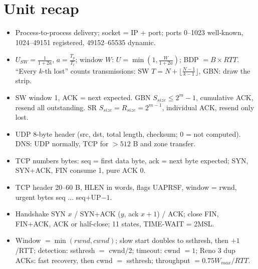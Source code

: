 \section*{Unit recap}
\begin{itemize}
  \item Process-to-process delivery; socket = IP + port; ports 0--1023 well-known, 1024--49151 registered, 49152--65535 dynamic.
  \item $U_{SW}=\frac{1}{1+2a}$, $a=\frac{T_p}{T_t}$; window $W$: $U=\min(1,\frac{W}{1+2a})$; BDP $=B\times RTT$. ``Every $k$-th lost'' counts transmissions: SW $T=N+\lfloor\frac{N-1}{k-1}\rfloor$, GBN: draw the strip.
  \item SW window 1, ACK = next expected. GBN $S_{size}\le2^m-1$, cumulative ACK, resend all outstanding. SR $S_{size}=R_{size}=2^{m-1}$, individual ACK, resend only lost.
  \item UDP 8-byte header (src, dst, total length, checksum; 0 = not computed). DNS: UDP normally, TCP for $>512$ B and zone transfer.
  \item TCP numbers bytes: seq = first data byte, ack = next byte expected; SYN, SYN+ACK, FIN consume 1, pure ACK 0.
  \item TCP header 20--60 B, HLEN in words, flags UAPRSF, window = rwnd, urgent bytes seq $\ldots$ seq+UP$-1$.
  \item Handshake SYN $x$ / SYN+ACK ($y$, ack $x+1$) / ACK; close FIN, FIN+ACK, ACK or half-close; 11 states, TIME-WAIT = 2MSL.
  \item Window $=\min(rwnd,cwnd)$; slow start doubles to ssthresh, then $+1$/RTT; detection: ssthresh $=$ cwnd/2; timeout: cwnd $=1$; Reno 3 dup ACKs: fast recovery, then cwnd $=$ ssthresh; throughput $=0.75W_{max}/RTT$.
\end{itemize}

